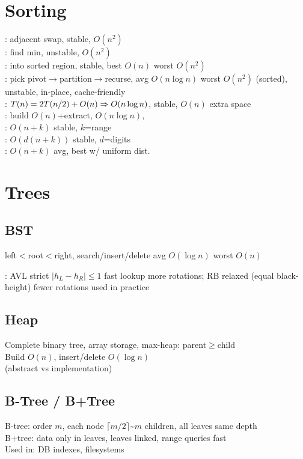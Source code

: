 \documentclass[lang=en,cols=5,paper=a4,fontsize=6pt,scheme=classic]{../cheatsheet}
\begin{document}
\startcols

\section{Sorting}
: adjacent swap, stable, $O(n^2)$\\
: find min, unstable, $O(n^2)$\\
: into sorted region, stable, best $O(n)$ worst $O(n^2)$\\
: pick pivot$\to$partition$\to$recurse, avg $O(n\log n)$ worst $O(n^2)$ (sorted), unstable, in-place, cache-friendly\\
: $T(n)=2T(n/2)+O(n)\Rightarrow O(n\log n)$, stable, $O(n)$ extra space\\
: build $O(n)$+extract, $O(n\log n)$, \\
: $O(n+k)$ stable, $k$=range\\
: $O(d(n+k))$ stable, $d$=digits\\
: $O(n+k)$ avg, best w/ uniform dist.

\section{Trees}
\subsection{BST}
left$<$root$<$right, search/insert/delete avg $O(\log n)$ worst $O(n)$

: AVL strict $|h_L-h_R|\le1$ fast lookup more rotations; RB relaxed (equal black-height) fewer rotations used in practice

\subsection{Heap}
Complete binary tree, array storage, max-heap: parent$\ge$child\\
Build $O(n)$, insert/delete $O(\log n)$\\
 (abstract vs implementation)

\subsection{B-Tree / B+Tree}
B-tree: order $m$, each node $\lceil m/2\rceil$\textasciitilde$m$ children, all leaves same depth\\
B+tree: data only in leaves, leaves linked, range queries fast\\
Used in: DB indexes, filesystems
\end{document}
